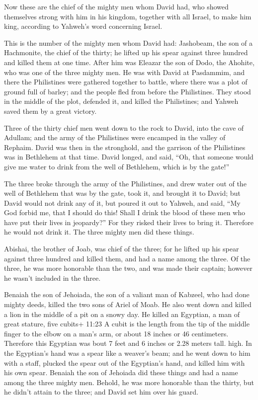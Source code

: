  Now these are the chief of the mighty men whom David had,
who showed themselves strong with him in his kingdom, together with all
Israel, to make him king, according to Yahweh's word concerning Israel.

 This is the number of the mighty men whom David had:
Jashobeam, the son of a Hachmonite, the chief of the thirty; he lifted
up his spear against three hundred and killed them at one time.
 After him was Eleazar the son of Dodo, the Ahohite, who
was one of the three mighty men.  He was with David at
Pasdammim, and there the Philistines were gathered together to battle,
where there was a plot of ground full of barley; and the people fled
from before the Philistines.  They stood in the middle of
the plot, defended it, and killed the Philistines; and Yahweh saved them
by a great victory.

 Three of the thirty chief men went down to the rock to
David, into the cave of Adullam; and the army of the Philistines were
encamped in the valley of Rephaim.  David was then in the
stronghold, and the garrison of the Philistines was in Bethlehem at that
time.  David longed, and said, ``Oh, that someone would
give me water to drink from the well of Bethlehem, which is by the
gate!''

 The three broke through the army of the Philistines, and
drew water out of the well of Bethlehem that was by the gate, took it,
and brought it to David; but David would not drink any of it, but poured
it out to Yahweh,  and said, ``My God forbid me, that I
should do this! Shall I drink the blood of these men who have put their
lives in jeopardy?'' For they risked their lives to bring it. Therefore
he would not drink it. The three mighty men did these things.

 Abishai, the brother of Joab, was chief of the three; for
he lifted up his spear against three hundred and killed them, and had a
name among the three.  Of the three, he was more honorable
than the two, and was made their captain; however he wasn't included in
the three.

 Benaiah the son of Jehoiada, the son of a valiant man of
Kabzeel, who had done mighty deeds, killed the two sons of Ariel of
Moab. He also went down and killed a lion in the middle of a pit on a
snowy day.  He killed an Egyptian, a man of great stature,
five cubits+ 11:23 A cubit is the length from the tip of the middle
finger to the elbow on a man's arm, or about 18 inches or 46
centimeters. Therefore this Egyptian was bout 7 feet and 6 inches or
2.28 meters tall. high. In the Egyptian's hand was a spear like a
weaver's beam; and he went down to him with a staff, plucked the spear
out of the Egyptian's hand, and killed him with his own spear.
 Benaiah the son of Jehoiada did these things and had a
name among the three mighty men.  Behold, he was more
honorable than the thirty, but he didn't attain to the three; and David
set him over his guard.

